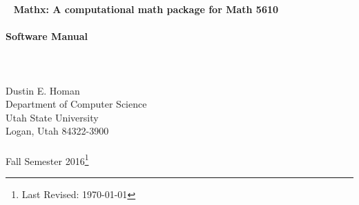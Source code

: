 \begin{center}
  \
  \vskip1.5in
  {\Large{\bf
    Mathx: A computational math package for Math 5610 \\
  \ \\
    Software Manual \\
  \ \\
  \ \\
  \ \\
  }}
  \vskip1.5in
  Dustin E. Homan \\
  Department of Computer Science \\
  Utah State University \\
  Logan, Utah 84322-3900 \\
   \ \\
  Fall Semester 2016\footnote{Last Revised: \today}
\end{center}

